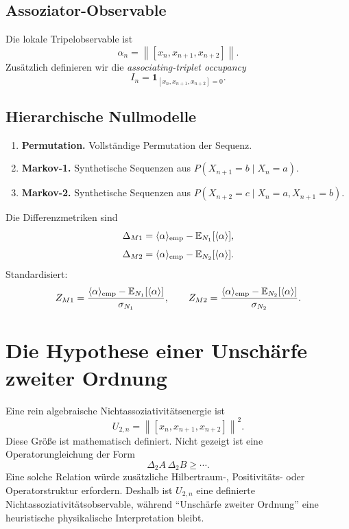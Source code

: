 \documentclass[11pt,a4paper]{article}
\newcommand{\norm}[1]{\left\lVert #1 \right\rVert}
\begin{document}
\subsection{Assoziator-Observable}
Die lokale Tripelobservable ist
\[
\boxed{\alpha_n=\norm{[x_n,x_{n+1},x_{n+2}]}.}
\]
Zusätzlich definieren wir die \emph{associating-triplet occupancy}
\[
I_n=\mathbf 1_{[x_n,x_{n+1},x_{n+2}]=0}.
\]

\subsection{Hierarchische Nullmodelle}
\begin{enumerate}[label=\textbf{$N_{\arabic*}$:},start=0]
\item \textbf{Permutation.} Vollständige Permutation der Sequenz.
\item \textbf{Markov-1.} Synthetische Sequenzen aus $P(X_{n+1}=b\mid X_n=a)$.
\item \textbf{Markov-2.} Synthetische Sequenzen aus $P(X_{n+2}=c\mid X_n=a,X_{n+1}=b)$.
\end{enumerate}
Die Differenzmetriken sind
\[
\Delta_{M1}=\langle\alpha\rangle_{\rm emp}-\mathbb E_{N_1}[\langle\alpha\rangle],
\]
\[
\Delta_{M2}=\langle\alpha\rangle_{\rm emp}-\mathbb E_{N_2}[\langle\alpha\rangle].
\]
Standardisiert:
\[
Z_{M1}=\frac{\langle\alpha\rangle_{\rm emp}-\mathbb E_{N_1}[\langle\alpha\rangle]}{\sigma_{N_1}},\qquad
Z_{M2}=\frac{\langle\alpha\rangle_{\rm emp}-\mathbb E_{N_2}[\langle\alpha\rangle]}{\sigma_{N_2}}.
\]

\section{Die Hypothese einer Unschärfe zweiter Ordnung}
Eine rein algebraische Nichtassoziativitätsenergie ist
\[
\boxed{U_{2,n}=\norm{[x_n,x_{n+1},x_{n+2}]}^2.}
\]
Diese Größe ist mathematisch definiert. Nicht gezeigt ist eine Operatorungleichung der Form
\[
\Delta_2A\,\Delta_2B\ge\cdots.
\]
Eine solche Relation würde zusätzliche Hilbertraum-, Positivitäts- oder Operatorstruktur erfordern. Deshalb ist $U_{2,n}$ eine definierte Nichtassoziativitätsobservable, während ``Unschärfe zweiter Ordnung'' eine heuristische physikalische Interpretation bleibt.
\end{document}
